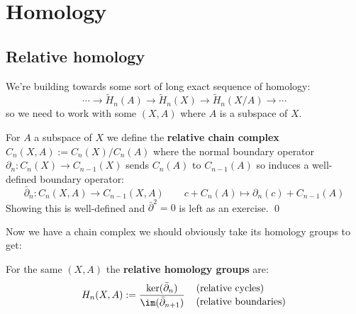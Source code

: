 \documentclass[a4paper]{article}
\begin{document}







\section{Homology}




\subsection{Relative homology}

We're building towards some sort of long exact sequence of homology:\[
    \cdots \rightarrow \tilde{H}_n(A)\rightarrow \tilde{H}_n(X)\rightarrow \tilde{H}_n(X/A)\rightarrow \cdots
\]
so we need to work with some $(X,A)$ where $A$ is a subspace of $X$.

\begin{definition}
    For $A$ a subspace of $X$ we define the \textbf{relative chain complex} $C_n(X,A):= C_n(X)/C_n(A)$ where the normal boundary operator $\partial_n:C_n(X)\rightarrow C_{n-1}(X)$ sends $C_n(A)$ to $C_{n-1}(A)$ so induces a well-defined boundary operator: \[
        \bar{\partial}_n:C_n(X,A)\rightarrow C_{n-1}(X,A) \qquad c + C_n(A) \mapsto \partial_n(c) + C_{n-1}(A)
    \]
    Showing this is well-defined and $\bar{\partial}^2=0$ is left as an exercise. \qed
\end{definition}
Now we have a chain complex we should obviously take its homology groups to get:

\begin{definition}
    For the same $(X,A)$ the \textbf{relative homology groups} are: \[
    H_n(X,A) := \frac{\ker(\bar{\partial}_n)}{\im(\bar{\partial}_{n+1})} \quad
    \genfrac{}{}{0pt}{}{\text{(relative cycles)\hspace{22pt}}}{\text{(relative boundaries)}}
    \]
\end{definition}
\end{document}
